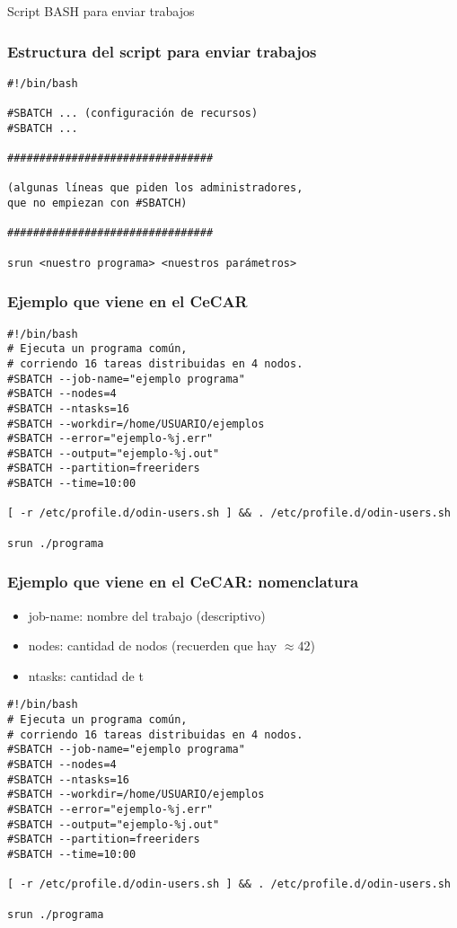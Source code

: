 \documentclass[handout]{beamer}
\begin{document}
\begin{frame}
\begin{center}
\huge{Script BASH para enviar trabajos}
\end{center}
\end{frame}


\begin{frame}[fragile]
\frametitle{Estructura del script para enviar trabajos}
\begin{verbatim}
#!/bin/bash

#SBATCH ... (configuración de recursos)
#SBATCH ...

################################

(algunas líneas que piden los administradores,
que no empiezan con #SBATCH)

################################

srun <nuestro programa> <nuestros parámetros>
\end{verbatim}
\end{frame}

\begin{frame}[fragile]
\frametitle{Ejemplo que viene en el CeCAR}
\begin{verbatim}
#!/bin/bash
# Ejecuta un programa común, 
# corriendo 16 tareas distribuidas en 4 nodos.
#SBATCH --job-name="ejemplo programa"
#SBATCH --nodes=4
#SBATCH --ntasks=16
#SBATCH --workdir=/home/USUARIO/ejemplos
#SBATCH --error="ejemplo-%j.err"
#SBATCH --output="ejemplo-%j.out"
#SBATCH --partition=freeriders
#SBATCH --time=10:00

[ -r /etc/profile.d/odin-users.sh ] && . /etc/profile.d/odin-users.sh

srun ./programa
\end{verbatim}
\end{frame}



\begin{frame}[fragile]
\frametitle{Ejemplo que viene en el CeCAR: nomenclatura}
\begin{itemize}
  \item job-name: nombre del trabajo (descriptivo)
  \item nodes: cantidad de nodos (recuerden que hay $\approx 42$)
  \item ntasks: cantidad de t
  \end{itemize}
\begin{verbatim}
#!/bin/bash
# Ejecuta un programa común, 
# corriendo 16 tareas distribuidas en 4 nodos.
#SBATCH --job-name="ejemplo programa"
#SBATCH --nodes=4
#SBATCH --ntasks=16
#SBATCH --workdir=/home/USUARIO/ejemplos
#SBATCH --error="ejemplo-%j.err"
#SBATCH --output="ejemplo-%j.out"
#SBATCH --partition=freeriders
#SBATCH --time=10:00

[ -r /etc/profile.d/odin-users.sh ] && . /etc/profile.d/odin-users.sh

srun ./programa
\end{verbatim}
\end{frame}
\end{document}
